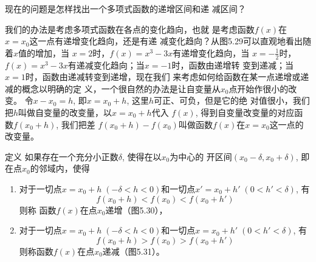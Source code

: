 现在的问题是怎样找出一个多项式函数的递增区间和递
减区间？

我们的办法是考虑多项式函数在各点的变化趋向，也就
是考虑函数$f(x)$在$x=x_0$这一点有递增变化趋向，还是有递
减变化趋向？从图5.29可以直观地看出随着$x$值的增加，当
$x=2$时，$f(x)=x^3-3x$有递增变化趋向，当
$x=-\frac{1}{2}$时，
$f(x)=x^3-3x$有递减变化趋向；当$x=-1$时，函数由递增转
变到递减；当$x=1$时，函数由递减转变到递增，现在我们
来考虑如何给函数在某一点递增或递减的概念以明确的定
义，一个很自然的办法是让自变量从$x_0$点开始作很小的改变。
令$x-x_0=h$, 即$x=x_0+h$, 这里$h$可正、可负，但是它的绝
对值很小，我们把$h$叫做自变量的改变量，以$x=x_0+h$代入
$f(x)$, 得到自变量改变量的对应函数$f(x_0+h)$, 我们把差
$f(x_0+h)-f(x_0)$叫做函数$f(x)$在$x=x_0$这一点的改变量。


\begin{blk}{定义}
    如果存在一个充分小正数$\delta $, 使得在以$x_0$为中心的
开区间$(x_0-\delta,x_0+\delta)$, 即在点$x_0$的邻域内，使得
\begin{enumerate}
    \item 对于一切点$x=x_0+h\; (-\delta<h<0)$和一切点$x'=
x_0+h'\; (0<h'<\delta)$, 有$$f(x_0+h)<f(x_0)<f(x_0+h')$$ 则称
函数$f(x)$在点$x_0$递增（图5.30），
\item 对于一切点$x=x_0+h\; (-\delta<h<0)$和一切点$x=x_0+
h'\; (0<h'<\delta)$, 有
$$f(x_0+h)>f(x_0)>f(x_0+h')$$
则称函数$f(x)$在点$x_0$递减（图5.31）。
\end{enumerate}
\end{blk}

